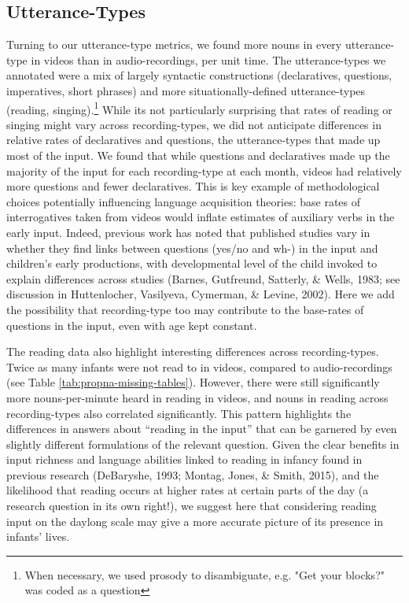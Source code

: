 \documentclass[floatsintext,man]{apa6}
\theoremstyle{definition}
\theoremstyle{definition}
\theoremstyle{definition}
\theoremstyle{remark}
\begin{document}
\hypertarget{utterance-types}{%
\subsection{Utterance-Types}\label{utterance-types}}

Turning to our utterance-type metrics, we found more nouns in every
utterance-type in videos than in audio-recordings, per unit time. The
utterance-types we annotated were a mix of largely syntactic
constructions (declaratives, questions, imperatives, short phrases) and
more situationally-defined utterance-types (reading,
singing).\footnote{When necessary, we used prosody to disambiguate, e.g. "Get your blocks?" was coded as a question}
While its not particularly surprising that rates of reading or singing
might vary across recording-types, we did not anticipate differences in
relative rates of declaratives and questions, the utterance-types that
made up most of the input. We found that while questions and
declaratives made up the majority of the input for each recording-type
at each month, videos had relatively more questions and fewer
declaratives. This is key example of methodological choices potentially
influencing language acquisition theories: base rates of interrogatives
taken from videos would inflate estimates of auxiliary verbs in the
early input. Indeed, previous work has noted that published studies vary
in whether they find links between questions (yes/no and wh-) in the
input and children's early productions, with developmental level of the
child invoked to explain differences across studies (Barnes, Gutfreund,
Satterly, \& Wells, 1983; see discussion in Huttenlocher, Vasilyeva,
Cymerman, \& Levine, 2002). Here we add the possibility that
recording-type too may contribute to the base-rates of questions in the
input, even with age kept constant.

The reading data also highlight interesting differences across
recording-types. Twice as many infants were not read to in videos,
compared to audio-recordings (see Table
\ref{tab:propna-missing-tables}). However, there were still
significantly more nouns-per-minute heard in reading in videos, and
nouns in reading across recording-types also correlated significantly.
This pattern highlights the differences in answers about
\enquote{reading in the input} that can be garnered by even slightly
different formulations of the relevant question. Given the clear
benefits in input richness and language abilities linked to reading in
infancy found in previous research (DeBaryshe, 1993; Montag, Jones, \&
Smith, 2015), and the likelihood that reading occurs at higher rates at
certain parts of the day (a research question in its own right!), we
suggest here that considering reading input on the daylong scale may
give a more accurate picture of its presence in infants' lives.
\end{document}
